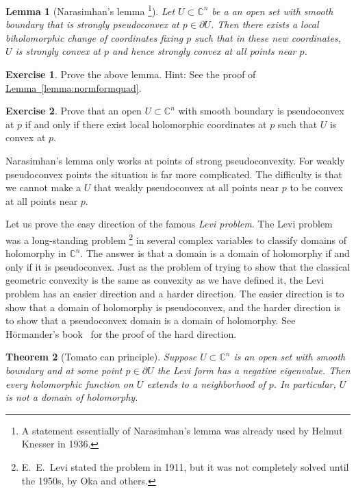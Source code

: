 \documentclass[12pt,openany]{book}
\newcommand{\C}{{\mathbb{C}}}
\newcommand{\myindex}[1]{#1\index{#1}}
\theoremstyle{plain}
\newtheorem{thm}{Theorem}[section]
\newtheorem{lemma}[thm]{Lemma}
\theoremstyle{remark}
\theoremstyle{definition}
\newenvironment{exbox}{%
    \def\FrameCommand{\vrule width 1pt \relax\hspace {10pt}}%
    \MakeFramed {\advance \hsize -\width \FrameRestore }%
}{%
    \endMakeFramed
}
\theoremstyle{exercise}
\newtheorem{exercise}{Exercise}[section]
\theoremstyle{example}
\newcommand{\lemmaref}[1]{\hyperref[#1]{Lemma~\ref*{#1}}}
\begin{document}
\begin{lemma}[Narasimhan's lemma%
\footnote{A statement essentially of Narasimhan's lemma was already used by Helmut
Knesser in 1936.}]
Let $U \subset \C^n$ be a an open set with smooth boundary
that is strongly pseudoconvex at $p \in \partial U$.  Then there exists a local biholomorphic change of
coordinates fixing $p$ such that in these new coordinates, $U$ is strongly
convex at $p$ and hence strongly convex at all points near $p$.
\end{lemma}

\begin{exbox}
\begin{exercise}
Prove the above lemma.  Hint: See the proof of \lemmaref{lemma:normformquad}.
\end{exercise}

\begin{exercise}
Prove that an open $U \subset \C^n$ with smooth boundary is pseudoconvex at
$p$ if and only if there exist local holomorphic coordinates at $p$ such that 
$U$ is convex at $p$.
\end{exercise}
\end{exbox}

Narasimhan's lemma only works at points of strong
pseudoconvexity.  For weakly pseudoconvex points the situation is far more
complicated.  The difficulty is that we cannot make a $U$ that
weakly pseudoconvex at all points near $p$ to be convex at all points near $p$.

\medskip


Let us prove the easy direction of the famous 
\emph{\myindex{Levi problem}}.  The Levi problem was a long-standing
problem%
\footnote{E.\ E.\ Levi stated the problem in 1911, but it was not completely
solved until the 1950s, by Oka and others.}
in several complex variables to classify domains of holomorphy in
$\C^n$.  The answer is that a domain is a domain of holomorphy if and only
if it is pseudoconvex.  Just as the problem of trying to show that
the classical geometric convexity is the same as convexity as we have
defined it, 
the Levi problem has an easier direction and a harder direction.
The easier direction is to show that a domain of holomorphy is pseudoconvex, and
the harder direction is to show that a pseudoconvex domain is a domain of
holomorphy.  See H\"ormander's book~\cite{Hormander} for the proof
of the hard direction.

\begin{thm}[Tomato can principle] \label{thm:tomatocan}
Suppose
$U \subset \C^n$ is an open set with smooth boundary and at some point $p \in
\partial U$ the Levi form has a negative eigenvalue.
Then every holomorphic function on $U$
extends to a neighborhood of $p$.
In particular, $U$ is not
a domain of holomorphy.
\end{thm}
\end{document}
